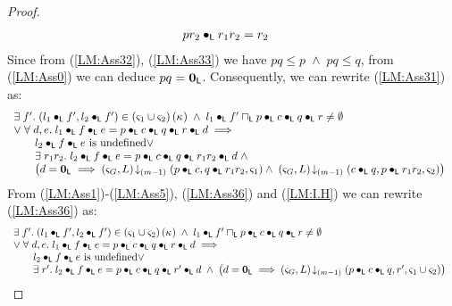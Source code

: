 \begin{lemma}[]
\begin{proof}
\begin{align}
	& pr_2 \bullet_{\textsf{L}} r_1r_2 = r_2 \label{LM:Ass35}
\end{align}
Since from (\ref{LM:Ass32}), (\ref{LM:Ass33}) we have $pq \leq p \;\land\; pq \leq q$, from (\ref{LM:Ass0}) we can deduce $pq = \mathbf{0}_{\textsf{L}}$. Consequently, we can rewrite (\ref{LM:Ass31}) as:
%
\begin{align}
	\begin{array}{l}
		\exists\; f'.\; (l_1 \bullet_{\textsf{L}} f', l_2 \bullet_{\textsf{L}} f') \in \left(\varsigma_{1} \cup \varsigma_{2}\right)(\kappa_{}) \;\land\; l_1 \bullet_{\textsf{L}} f' \sqcap_{\textsf{L}} p \bullet_{\textsf{L}} c \bullet_{\textsf{L}} q \bullet_{\textsf{L}} r \not= \emptyset\\
		\lor\;\forall\; d, e.\;  l_1 \bullet_{\textsf{L}} f \bullet_{\textsf{L}} e = p \bullet_{\textsf{L}} c \bullet_{\textsf{L}} q \bullet_{\textsf{L}} r \bullet_{\textsf{L}} d \implies\\
		\hspace*{0.5cm}
		\begin{array}{l l}
			l_2 \bullet_{\textsf{L}} f \bullet_{\textsf{L}} e \text{ is undefined} \lor\;\\
			\exists\; r_1r_2.\; l_2 \bullet_{\textsf{L}} f \bullet_{\textsf{L}} e = p \bullet_{\textsf{L}} c \bullet_{\textsf{L}} q  \bullet_{\textsf{L}} r_1r_2 \bullet_{\textsf{L}} d \;\land\\ 			\left( d = \mathbf{0}_{\textsf{L}} \implies \left(\varsigma_{G}, L\right) \!\downarrow_{(m-1)} \left(p \bullet_{\textsf{L}} c, q \bullet_{\textsf{L}} r_1r_2, \varsigma_{1}\right) \land\; \left(\varsigma_{G}, L\right) \!\downarrow_{(m-1)} \left(c \bullet_{\textsf{L}} q, p \bullet_{\textsf{L}} r_1r_2, \varsigma_{2}\right)\right)
		\end{array}
	\end{array} \label{LM:Ass36}
\end{align}
From (\ref{LM:Ass1})-(\ref{LM:Ass5}), (\ref{LM:Ass36}) and (\ref{LM:I.H}) we can rewrite (\ref{LM:Ass36}) as:
%
\begin{align}
	\begin{array}{l}
		\exists\; f'.\; (l_1 \bullet_{\textsf{L}} f', l_2 \bullet_{\textsf{L}} f') \in \left(\varsigma_{1} \cup \varsigma_{2}\right)(\kappa_{}) \;\land\; l_1 \bullet_{\textsf{L}} f' \sqcap_{\textsf{L}} p \bullet_{\textsf{L}} c \bullet_{\textsf{L}} q \bullet_{\textsf{L}} r \not= \emptyset\\
		\lor\;\forall\; d, e.\;  l_1 \bullet_{\textsf{L}} f \bullet_{\textsf{L}} e = p \bullet_{\textsf{L}} c \bullet_{\textsf{L}} q \bullet_{\textsf{L}} r \bullet_{\textsf{L}} d \implies\\
		\hspace*{0.5cm}
		\begin{array}{l l}
			l_2 \bullet_{\textsf{L}} f \bullet_{\textsf{L}} e \text{ is undefined} \lor\;\\
			\exists\; r'.\; l_2 \bullet_{\textsf{L}} f \bullet_{\textsf{L}} e = p \bullet_{\textsf{L}} c \bullet_{\textsf{L}} q  \bullet_{\textsf{L}} r' \bullet_{\textsf{L}} d \;\land\; \left( d = \mathbf{0}_{\textsf{L}} \implies \left(\varsigma_{G}, L\right) \!\downarrow_{(m-1)} \left(p \bullet_{\textsf{L}} c \bullet_{\textsf{L}} q, r', \varsigma_{1} \cup \varsigma_{2}\right) \right)
		\end{array}
	\end{array}  \label{LM:Ass37}
\end{align}
%
%
%
%
%


\end{proof}
\end{lemma}
